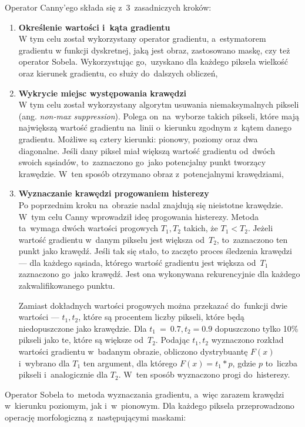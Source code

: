 \documentclass[a4paper,11pt,twoside,openright]{report}
\theoremstyle{definition}
\begin{document}
Operator Canny'ego \cite{Canny} składa się z~3~zasadniczych kroków:
\begin{enumerate}%
\item \textbf {Określenie wartości i~kąta gradientu} \\
W tym celu został wykorzystany operator gradientu, a~estymatorem gradientu w
funkcji dyskretnej, jaką jest obraz, zastosowano maskę, czy też operator Sobela.
Wykorzystując go,~uzyskano dla każdego piksela wielkość oraz kierunek gradientu,
co służy do~dalszych obliczeń,
\item \textbf {Wykrycie miejsc występowania krawędzi} \\
W tym celu został wykorzystany algorytm usuwania niemaksymalnych pikseli
(ang. \textit{non-max suppression}). Polega on~na~wyborze
takich pikseli, które mają największą wartość gradientu na~linii o~kierunku
zgodnym z~kątem danego gradientu. Możliwe są cztery kierunki: pionowy, poziomy oraz
dwa diagonalne. Jeśli dany piksel miał większą wartość gradientu od~dwóch swoich
sąsiadów, to~zaznaczono go~jako potencjalny punkt tworzący krawędzie. W~ten sposób
otrzymano obraz z~potencjalnymi krawędziami,
\item \textbf {Wyznaczanie krawędzi progowaniem histerezy} \\
Po poprzednim kroku na~obrazie nadal znajdują się nieistotne krawędzie. W~tym celu
Canny wprowadził ideę progowania histerezy. Metoda ta~wymaga dwóch wartości progowych
$T_1, T_2$ takich, że $T_1 < T_2$. Jeżeli wartość gradientu w~danym pikselu jest
większa od~$T_2$, to~zaznaczono ten punkt jako krawędź. Jeśli tak się stało, to
zaczęto proces śledzenia krawędzi --- dla każdego sąsiada, którego wartość gradientu
jest większa od~$T_1$ zaznaczono go~jako krawędź. Jest ona wykonywana rekurencyjnie
dla każdego zakwalifikowanego punktu.

Zamiast dokładnych wartości progowych można przekazać do~funkcji dwie wartości ---
$t_1, t_2$, które są procentem liczby pikseli, które będą niedopuszczone jako
krawędzie. Dla $t_1~=~0.7, t_2 = 0.9$ dopuszczono tylko 10\% pikseli jako te,
które są większe od~$T_2$. Podając $t_1, t_2$ wyznaczono rozkład wartości
gradientu w~badanym obrazie, obliczono dystrybuantę $F(x)$ i~wybrano dla $T_1$
ten argument, dla którego $F(x) = t_1 * p$, gdzie $p$ to~liczba pikseli i~analogicznie
dla $T_2$. W~ten sposób wyznaczono progi do~histerezy.

\end{enumerate}

Operator Sobela \cite{Sobel} to~metoda wyznaczania gradientu, a~więc zarazem
krawędzi w~kierunku poziomym, jak i~w~pionowym. Dla każdego piksela
przeprowadzono operację morfologiczną z~następującymi maskami:
\end{document}
